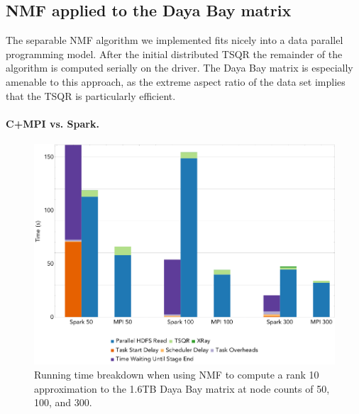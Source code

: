 \subsection{NMF applied to the Daya Bay matrix}
The separable NMF algorithm we implemented fits nicely into a data parallel programming model. After the initial distributed TSQR the remainder of the algorithm is computed serially on the driver. The Daya Bay matrix is especially amenable to this approach, as the extreme aspect ratio of the data set implies that the TSQR is particularly efficient.

\paragraph{C+MPI vs. Spark.}

\begin{figure}[thb!]
\begin{center}
\includegraphics[width=.9\textwidth]{fig/nmf_run_times.png}
\caption{Running time breakdown when using NMF to compute a rank 10 approximation to the 1.6TB Daya Bay matrix at 
node counts of 50, 100, and 300.}
\label{fig:nmfrt}
\end{center}
\end{figure}


